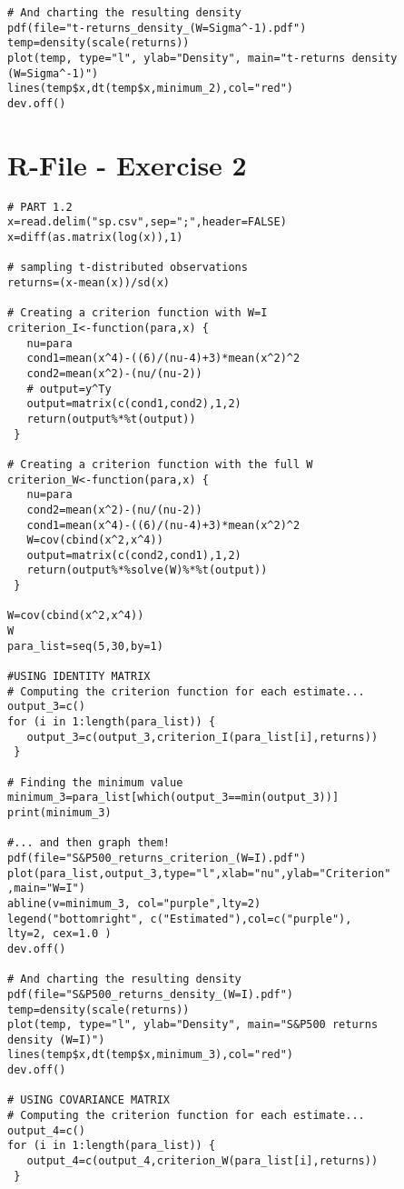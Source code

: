 \begin{appendices}
\begin{verbatim}
# And charting the resulting density
pdf(file="t-returns_density_(W=Sigma^-1).pdf")
temp=density(scale(returns))
plot(temp, type="l", ylab="Density", main="t-returns density
(W=Sigma^-1)")
lines(temp$x,dt(temp$x,minimum_2),col="red")
dev.off()
\end{verbatim}

\chapter{R-File - Exercise 2}

\begin{verbatim}
# PART 1.2
x=read.delim("sp.csv",sep=";",header=FALSE)
x=diff(as.matrix(log(x)),1)

# sampling t-distributed observations
returns=(x-mean(x))/sd(x)
       
# Creating a criterion function with W=I
criterion_I<-function(para,x) {
   nu=para
   cond1=mean(x^4)-((6)/(nu-4)+3)*mean(x^2)^2
   cond2=mean(x^2)-(nu/(nu-2))
   # output=y^Ty
   output=matrix(c(cond1,cond2),1,2)
   return(output%*%t(output))
 }
       
# Creating a criterion function with the full W
criterion_W<-function(para,x) {
   nu=para
   cond2=mean(x^2)-(nu/(nu-2))
   cond1=mean(x^4)-((6)/(nu-4)+3)*mean(x^2)^2
   W=cov(cbind(x^2,x^4))
   output=matrix(c(cond2,cond1),1,2)
   return(output%*%solve(W)%*%t(output))
 }

W=cov(cbind(x^2,x^4))
W
para_list=seq(5,30,by=1)

#USING IDENTITY MATRIX
# Computing the criterion function for each estimate...
output_3=c()
for (i in 1:length(para_list)) {
   output_3=c(output_3,criterion_I(para_list[i],returns))
 }
       
# Finding the minimum value
minimum_3=para_list[which(output_3==min(output_3))]
print(minimum_3)

#... and then graph them!
pdf(file="S&P500_returns_criterion_(W=I).pdf")
plot(para_list,output_3,type="l",xlab="nu",ylab="Criterion"
,main="W=I")
abline(v=minimum_3, col="purple",lty=2)
legend("bottomright", c("Estimated"),col=c("purple"),
lty=2, cex=1.0 )
dev.off()

# And charting the resulting density
pdf(file="S&P500_returns_density_(W=I).pdf")
temp=density(scale(returns))
plot(temp, type="l", ylab="Density", main="S&P500 returns
density (W=I)")
lines(temp$x,dt(temp$x,minimum_3),col="red")       
dev.off()

# USING COVARIANCE MATRIX
# Computing the criterion function for each estimate...
output_4=c()
for (i in 1:length(para_list)) {
   output_4=c(output_4,criterion_W(para_list[i],returns))
 }


\end{verbatim}
\end{appendices}
